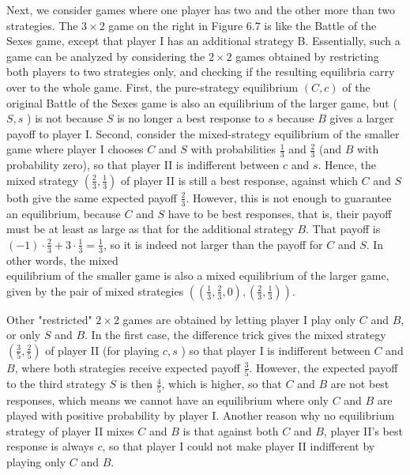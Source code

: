\documentclass[12pt]{article}
\begin{document}
Next, we consider games where one player has two and the other more than two strategies. The $3 \times 2$ game on the right in Figure 6.7 is like the Battle of the Sexes game, except that player I has an additional strategy B. Essentially, such a game can be analyzed by considering the $2 \times 2$ games obtained by restricting both players to two strategies only, and checking if the resulting equilibria carry over to the whole game. First, the pure-strategy equilibrium $(C, c)$ of the original Battle of the Sexes game is also an equilibrium of the larger game, but ( $S, s$ ) is not because $S$ is no longer a best response to $s$ because $B$ gives a larger payoff to player I. Second, consider the mixed-strategy equilibrium of the smaller game where player I chooses $C$ and $S$ with probabilities $\frac{1}{3}$ and $\frac{2}{3}$ (and $B$ with probability zero), so that player II is indifferent between $c$ and $s$. Hence, the mixed strategy $\left(\frac{2}{3}, \frac{1}{3}\right)$ of player II is still a best response, against which $C$ and $S$ both give the same expected payoff $\frac{2}{3}$. However, this is not enough to guarantee an equilibrium, because $C$ and $S$ have to be best responses, that is, their payoff must be at least as large as that for the additional strategy $B$. That payoff is $(-1) \cdot \frac{2}{3}+3 \cdot \frac{1}{3}=\frac{1}{3}$, so it is indeed not larger than the payoff for $C$ and $S$. In other words, the mixed\\
equilibrium of the smaller game is also a mixed equilibrium of the larger game, given by the pair of mixed strategies $\left(\left(\frac{1}{3}, \frac{2}{3}, 0\right),\left(\frac{2}{3}, \frac{1}{3}\right)\right)$.

Other "restricted" $2 \times 2$ games are obtained by letting player I play only $C$ and $B$, or only $S$ and $B$. In the first case, the difference trick gives the mixed strategy $\left(\frac{3}{5}, \frac{2}{5}\right)$ of player II (for playing $c, s$ ) so that player I is indifferent between $C$ and $B$, where both strategies receive expected payoff $\frac{3}{5}$. However, the expected payoff to the third strategy $S$ is then $\frac{4}{5}$, which is higher, so that $C$ and $B$ are not best responses, which means we cannot have an equilibrium where only $C$ and $B$ are played with positive probability by player I. Another reason why no equilibrium strategy of player II mixes $C$ and $B$ is that against both $C$ and $B$, player II's best response is always $c$, so that player I could not make player II indifferent by playing only $C$ and $B$.
\end{document}
